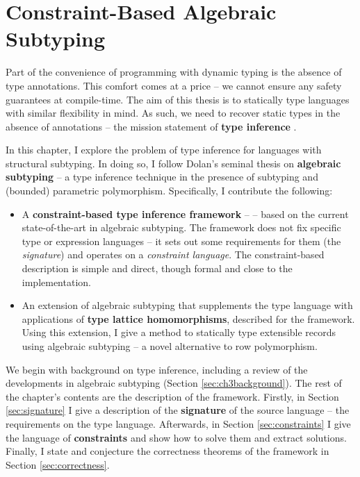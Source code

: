 \newcommand{\mlsub}{\textsc{MLsub}}
\newcommand{\simplesub}{\textsc{Simple-sub}}
\newcommand{\mlstruct}{\textsc{MLstruct}}
\newenvironment{example}{ %
    \begin{tcolorbox}[ %
        colback=blue!5!white, %
        colframe=blue!60!black, %
        title=\textsc{Example} %
    ] %
}{ %
    \end{tcolorbox} %
}

\chapter{Constraint-Based Algebraic Subtyping}
\label{algebraic-subtyping}

Part of the convenience of programming with dynamic typing is the absence of type annotations. 
This comfort comes at a price -- we cannot ensure any safety guarantees at compile-time. 
The aim of this thesis is to statically type languages with similar flexibility in mind. As such, we need to recover static types in the absence of annotations -- the mission statement of \textbf{type inference} \cite{tapl}.

In this chapter, I explore the problem of type inference for languages with structural subtyping. In doing so, I follow Dolan's seminal thesis on \textbf{algebraic subtyping} -- a type inference technique in the presence of subtyping and (bounded) parametric polymorphism. Specifically, I contribute the following:
\begin{itemize}
    \item A \textbf{constraint-based type inference framework} -- \inference{} -- based on the current state-of-the-art in algebraic subtyping. The framework does not fix specific type or expression languages -- it sets out some requirements for them (the \textit{signature}) and operates on a \emph{constraint language}. The constraint-based description is simple and direct, though formal and close to the implementation. 
    \item An extension of algebraic subtyping that supplements the type language with applications of \textbf{type lattice homomorphisms}, described for the framework. Using this extension, I give a method to statically type extensible records using algebraic subtyping -- a novel alternative to row polymorphism. 
\end{itemize}

We begin with background on type inference, including a review of the developments in algebraic subtyping (Section \ref{sec:ch3background}). The rest of the chapter's contents are the description of the framework. Firstly, in Section \ref{sec:signature} I give a description of the \textbf{signature} of the source language -- the requirements on the type language. Afterwards, in Section \ref{sec:constraints} I give the language of \textbf{constraints} and show how to solve them and extract solutions. Finally, I state and conjecture the correctness theorems of the framework in Section \ref{sec:correctness}. 

